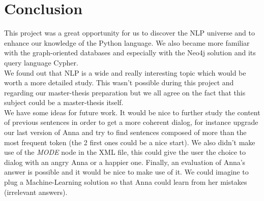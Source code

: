 \section{Conclusion}
This project was a great opportunity for us to discover the NLP universe and to enhance our knowledge of the Python language. We also became more familiar with the graph-oriented databases and especially with the Neo4j solution and its query language Cypher.\\

We found out that NLP is a wide and really interesting topic which would be worth a more detailed study. This wasn't possible during this project and regarding our master-thesis preparation but we all agree on the fact that this subject could be a master-thesis itself.\\

We have some ideas for future work. It would be nice to further study the content of previous sentences in order to get a more coherent dialog, for instance upgrade our last version of Anna and try to find sentences composed of more than the most frequent token (the 2 first ones could be a nice start). We also didn't make use of the \emph{MODE} node in the XML file, this could give the user the choice to dialog with an angry Anna or a happier one. Finally, an evaluation of Anna's answer is possible and it would be nice to make use of it. We could imagine to plug a Machine-Learning solution so that Anna could learn from her mistakes (irrelevant answers).